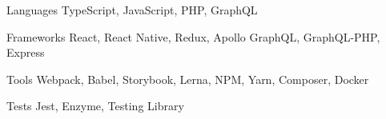 

\begin{cvskills}

  \cvskill
    {Languages} %
    {TypeScript, JavaScript, PHP, GraphQL} %

  \cvskill
    {Frameworks} %
    {React, React Native, Redux, Apollo GraphQL, GraphQL-PHP, Express} %

  \cvskill
    {Tools} %
    {Webpack, Babel, Storybook, Lerna, NPM, Yarn, Composer, Docker} %

  \cvskill
    {Tests} %
    {Jest, Enzyme, Testing Library} %

\end{cvskills}
